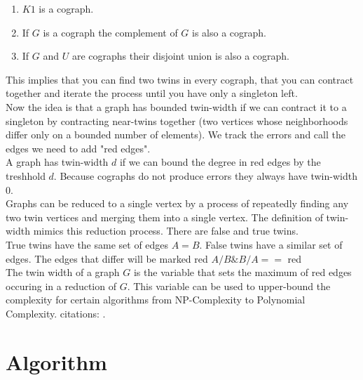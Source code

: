 \documentclass[10pt]{article}
\begin{document}
\begin{enumerate}
	\item $K1$ is a cograph.
	\item If $G$ is a cograph the complement of $G$ is also a cograph.
	\item If $G$ and $U$ are cographs their disjoint union is also a cograph.
\end{enumerate}

This implies that you can find two twins in every cograph, that you can contract together
and iterate the process until you have only a singleton left.\\
Now the idea is that a graph has bounded twin-width if we can contract it to a singleton
by contracting near-twins together (two vertices whose neighborhoods differ only on a
bounded number of elements). We track the errors and call the edges we need to
add "red edges".\\
A graph has twin-width $d$ if we can bound the degree in red edges by the treshhold $d$.
Because cographs do not produce errors they always have twin-width $0$. \\

Graphs can be reduced to a single vertex by a process of repeatedly finding any two
twin vertices and merging them into a single vertex. The definition of twin-width mimics
this reduction process. There are false and true twins.\\
True twins have the same set of edges $A = B$. False twins have a similar set of edges. The
edges that differ will be marked red ${A / B \& B/A} ==$ red\\
The twin width of a graph $G$ is the variable that sets the maximum of red edges occuring in a
reduction of $G$. This variable can be used to upper-bound the complexity for
certain algorithms from NP-Complexity to Polynomial Complexity. citations:
\cite{bonnet2021twini} \cite{bonnet2021twinii}.

\section{Algorithm}
\end{document}
